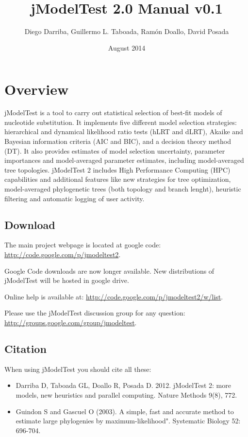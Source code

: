 \documentclass[11pt,twoside,a4paper]{article}
\begin{document}
\title{jModelTest 2.0 Manual v0.1}
\author{Diego Darriba, Guillermo L. Taboada, Ram\'on Doallo, David Posada}
\date{August 2014}
\maketitle

\tableofcontents

\section{Overview}

jModelTest is a tool to carry out statistical selection of best-fit models of nucleotide substitution. It implements five different model selection strategies: hierarchical and dynamical likelihood ratio tests (hLRT and dLRT), Akaike and Bayesian information criteria (AIC and BIC), and a decision theory method (DT). It also provides estimates of model selection uncertainty, parameter importances and model-averaged parameter estimates, including model-averaged tree topologies. jModelTest 2 includes High Performance Computing (HPC) capabilities and additional features like new strategies for tree optimization, model-averaged phylogenetic trees (both topology and branch lenght), heuristic filtering and automatic logging of user activity.

\subsection{Download}

The main project webpage is located at google code: \url{http://code.google.com/p/jmodeltest2}.

Google Code downloads are now longer available. New distributions of jModelTest will be hosted in google drive.

Online help is available at: \url{http://code.google.com/p/jmodeltest2/w/list}.

Please use the jModelTest discussion group for any question: \url{http://groups.google.com/group/jmodeltest}.

\subsection{Citation}

When using jModelTest you should cite all these:

\begin{itemize}
\item Darriba D, Taboada GL, Doallo R, Posada D. 2012. jModelTest 2: more models, new heuristics and parallel computing. Nature Methods 9(8), 772.
\item Guindon S and Gascuel O (2003). A simple, fast and accurate method to estimate large phylogenies by maximum-likelihood". Systematic Biology 52: 696-704. 
\end{itemize}
\end{document}
